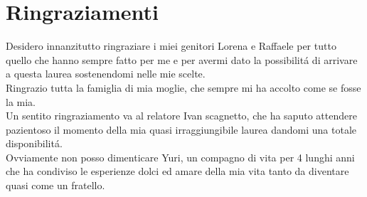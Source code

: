 \chapter{Ringraziamenti}
Desidero innanzitutto ringraziare i miei genitori Lorena e Raffaele per tutto quello che hanno sempre fatto per me e per avermi dato la possibilit\'a di arrivare a questa laurea sostenendomi nelle mie scelte.\\
Ringrazio tutta la famiglia di mia moglie, che sempre mi ha accolto come se fosse la mia.\\
Un sentito ringraziamento va al relatore Ivan scagnetto, che ha saputo attendere pazientoso il momento della mia quasi irraggiungibile laurea dandomi una totale disponibilit\'a.\\
Ovviamente non posso dimenticare Yuri, un compagno di vita per 4 lunghi anni che ha condiviso le esperienze dolci ed amare della mia vita tanto da diventare quasi come un fratello.
